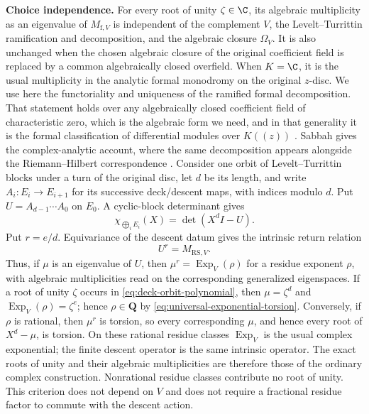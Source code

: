 \noindent\textbf{Choice independence.}
For every root of unity \(\zeta\in\C\), its algebraic multiplicity as an
eigenvalue of \(M_{\mathrm f,V}\) is independent of the complement \(V\), the
Levelt--Turrittin ramification and decomposition, and the algebraic closure
\(\Omega_V\).  It is also unchanged when the chosen algebraic closure of the
original coefficient field is replaced by a common algebraically closed
overfield.  When \(K=\C\), it is the usual multiplicity in the analytic
formal monodromy on the original \(z\)-disc.
We use here the functoriality and uniqueness of the ramified formal
decomposition.  That statement holds over any algebraically closed coefficient
field of characteristic zero, which is the algebraic form we need, and in that
generality it is the formal classification of differential modules over
\(K(\!(z)\!)\) \cite[Chapter~3]{PutSinger}.  Sabbah gives the
complex-analytic account, where the same decomposition appears alongside the
Riemann--Hilbert correspondence
\cite[Lecture~5, Section~5.c, proofs of Theorem~5.8 and
Proposition~5.10]{SabbahStokes}.
Consider one orbit of Levelt--Turrittin blocks under a turn of the original
disc, let \(d\) be its length, and write
\(A_i:E_i\longrightarrow E_{i+1}\) for its successive deck/descent maps,
with indices modulo \(d\).  Put
\(U=A_{d-1}\cdots A_0\) on \(E_0\).  A cyclic-block determinant gives
\[
 \chi_{\bigoplus_iE_i}(X)=\det(X^dI-U).
 \label{eq:deck-orbit-polynomial}
\]
Put \(r=e/d\).  Equivariance of the descent datum gives the intrinsic return
relation
\[
 U^r=M_{\mathrm{RS},V}.
 \label{eq:deck-return-power}
\]
Thus, if \(\mu\) is an eigenvalue of \(U\), then
\(\mu^r=\operatorname{Exp}_V(\rho)\) for a residue exponent \(\rho\), with
algebraic multiplicities read on the corresponding generalized eigenspaces.
If a root of unity \(\zeta\) occurs in
\eqref{eq:deck-orbit-polynomial}, then \(\mu=\zeta^d\) and
\(\operatorname{Exp}_V(\rho)=\zeta^e\); hence \(\rho\in\mathbf Q\) by
\eqref{eq:universal-exponential-torsion}.  Conversely, if \(\rho\) is
rational, then \(\mu^r\) is torsion, so every corresponding \(\mu\), and
hence every root of \(X^d-\mu\), is torsion.  On these rational residue
classes \(\operatorname{Exp}_V\) is the usual complex exponential; the
finite descent operator is the same intrinsic operator.  The exact roots of
unity and their algebraic multiplicities are therefore those of the ordinary
complex construction.  Nonrational residue classes contribute no root of
unity.  This criterion does not depend on \(V\) and does not require a
fractional residue factor to commute with the descent action.

